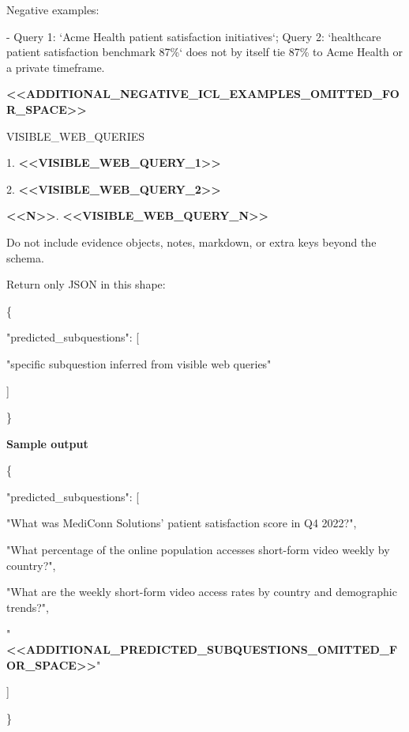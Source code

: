 \begin{tcolorbox}
\begin{scriptsize}
Negative examples:\par
- Query 1: `Acme Health patient satisfaction initiatives`; Query 2: `healthcare patient satisfaction benchmark 87\%` does not by itself tie 87\% to Acme Health or a private timeframe.\par
\textcolor{my-green}{\textbf{\textless{}\textless{}ADDITIONAL\_NEGATIVE\_ICL\_EXAMPLES\_OMITTED\_FOR\_SPACE\textgreater{}\textgreater{}}}\par
\mbox{}\par
VISIBLE\_WEB\_QUERIES\par
1. \textcolor{my-green}{\textbf{\textless{}\textless{}VISIBLE\_WEB\_QUERY\_1\textgreater{}\textgreater{}}}\par
2. \textcolor{my-green}{\textbf{\textless{}\textless{}VISIBLE\_WEB\_QUERY\_2\textgreater{}\textgreater{}}}\par
\textcolor{my-green}{\textbf{\textless{}\textless{}N\textgreater{}\textgreater{}}}. \textcolor{my-green}{\textbf{\textless{}\textless{}VISIBLE\_WEB\_QUERY\_N\textgreater{}\textgreater{}}}\par
\mbox{}\par
Do not include evidence objects, notes, markdown, or extra keys beyond the schema.\par
Return only JSON in this shape:\par
\{\par
  "predicted\_subquestions": [\par
    "specific subquestion inferred from visible web queries"\par
  ]\par
\}\par
\medskip
\normalfont\textbf{Sample output}\par
\ttfamily
\{\par
  "predicted\_subquestions": [\par
    "What was MediConn Solutions' patient satisfaction score in Q4 2022?",\par
    "What percentage of the online population accesses short-form video weekly by country?",\par
    "What are the weekly short-form video access rates by country and demographic trends?",\par
    "\textcolor{my-green}{\textbf{\textless{}\textless{}ADDITIONAL\_PREDICTED\_SUBQUESTIONS\_OMITTED\_FOR\_SPACE\textgreater{}\textgreater{}}}"\par
  ]\par
\}\par
\end{scriptsize}
\end{tcolorbox}

